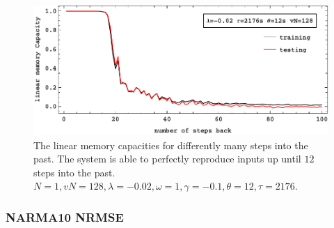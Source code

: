 	\begin{figure}
	\centering
	\includegraphics[width=0.99\linewidth]{pics/linearMemoryCurveN1}
	\caption{The linear memory capacities for differently many steps into the past. The system is able to perfectly reproduce inputs up until $12$ steps into the past. $N=1, vN=128, \lambda=-0.02, \omega=1, \gamma=-0.1, \theta=12, \tau=2176$. }
	\label{fig:linearMemoryRecallCurveN1}
	\end{figure}


\subsubsection{NARMA10 NRMSE}

